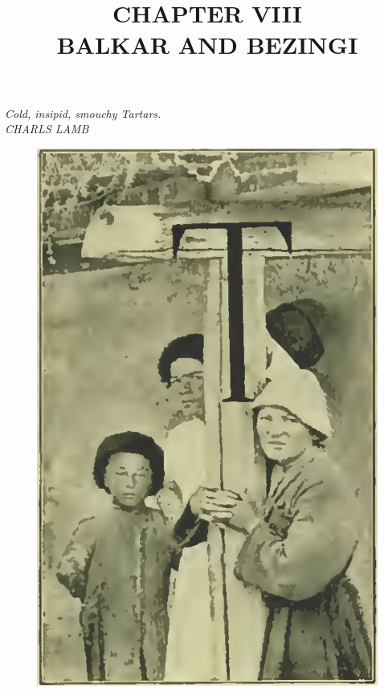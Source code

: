 \documentclass[25pt, a4paper]{article}
\begin{document}
\title{CHAPTER VIII \\ BALKAR AND BEZINGI}
\maketitle	
\begin{flushright}
		\textit{Cold, insipid, smouchy Tartars.\\ CHARLS LAMB}
\end{flushright}
\begin{figure}
	\centering
	\vspace{-40pt}
	\includegraphics[width=1\linewidth]{Figure 1}
	\vspace{-30pt}
\end{figure}
\end{document}
